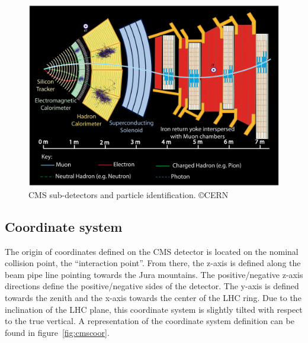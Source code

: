 \begin{figure}[!Hhtbp]
  \begin{center}
    \includegraphics[width=\textwidth]{figs/PictureforPoint5_oct04_allp.jpg}
    \caption{CMS sub-detectors and particle identification. \copyright CERN}
    \label{fig:cmsslice}
  \end{center}
\end{figure}

\subsection{Coordinate system}
\label{sec:Csys}

The origin of coordinates defined on the CMS detector is located on the nominal collision point, the ``interaction point''. From there, the z-axis is defined along the beam pipe line pointing towards the Jura mountains. The positive/negative z-axis directions define the positive/negative sides of the detector. The y-axis is defined towards the zenith and the x-axis towards the center of the LHC ring. Due to the inclination of the LHC plane, this coordinate system is slightly tilted with respect to the true vertical. A representation of the coordinate system definition can be found in figure~\ref{fig:cmscoor}. 

